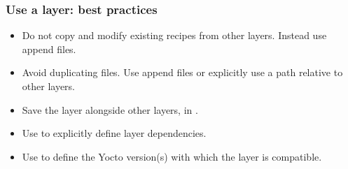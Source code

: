 \begin{frame}
  \frametitle{Use a layer: best practices}
  \begin{itemize}
    \item Do not copy and modify existing recipes from other layers.
      Instead use append files.
    \item Avoid duplicating files. Use append files or explicitly use
      a path relative to other layers.
    \item Save the layer alongside other layers, in .
    \item Use  to explicitly define layer
      dependencies.
    \item Use  to define the Yocto version(s)
    with which the layer is compatible.
  \end{itemize}
\end{frame}
